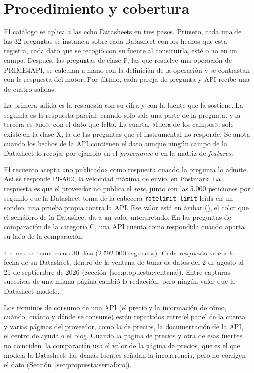 \section{Procedimiento y cobertura}\label{sec:comparacion:procedimiento}\label{sec:hallazgos:comparacion}

El catálogo se aplica a las ocho Datasheets en tres pasos.
Primero, cada una de las 32 preguntas se instancia sobre cada Datasheet con los hechos que esta registra, cada dato que se recogió con su fuente al construirla, esté o no en un campo.
Después, las preguntas de clase P, las que resuelve una operación de PRIME4API, se calculan a mano con la definición de la operación y se contrastan con la respuesta del motor.
Por último, cada pareja de pregunta y API recibe una de cuatro salidas.

La primera salida es la respuesta con su cifra y con la fuente que la sostiene.
La segunda es la respuesta parcial, cuando solo sale una parte de la pregunta, y la tercera es «no», con el dato que falta.
La cuarta, «fuera de los campos», solo existe en la clase X, la de las preguntas que el instrumental no responde.
Se anota cuando los hechos de la API contienen el dato aunque ningún campo de la Datasheet lo recoja, por ejemplo en el \textit{provenance} o en la matriz de \textit{features}.

El recuento acepta «no publicado» como respuesta cuando la pregunta lo admite.
Así se responde PI-A02, la velocidad máxima de envío, en Postmark.
La respuesta es que el proveedor no publica el \textit{rate}, junto con las 5.000 peticiones por segundo que la Datasheet toma de la cabecera \texttt{ratelimit-limit} leída en un sondeo, una prueba propia contra la API.
Ese valor está en ámbar (\semambar{}), el color que el semáforo de la Datasheet da a un valor interpretado.
En las preguntas de comparación de la categoría C, una API cuenta como respondida cuando aporta su lado de la comparación.

Un mes se toma como 30 días (2.592.000 segundos).
Cada respuesta vale a la fecha de su Datasheet, dentro de la ventana de toma de datos del 2 de agosto al 21 de septiembre de 2026 (Sección~\ref{sec:propuesta:ventana}).
Entre capturas sucesivas de una misma página cambió la redacción, pero ningún valor que la Datasheet modele.

Los términos de consumo de una API (el precio y la información de cómo, cuándo, cuánto y dónde se consume) están repartidos entre el panel de la cuenta y varias páginas del proveedor, como la de precios, la documentación de la API, el centro de ayuda o el blog.
Cuando la página de precios y otra de esas fuentes no coinciden, la comparación usa el valor de la página de precios, que es el que modela la Datasheet: las demás fuentes señalan la incoherencia, pero no corrigen el dato (Sección~\ref{sec:propuesta:semaforo}).

